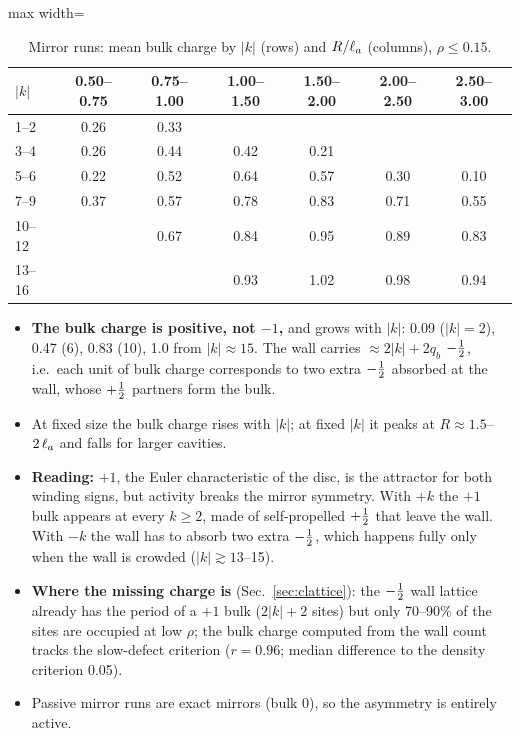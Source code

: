 \begin{table}[H]\centering\small
\caption{Mirror runs: mean bulk charge by $|k|$ (rows) and $R/\ell_a$ (columns), $\rho\le0.15$.}\label{tab:mirror2}
\begin{adjustbox}{max width=\textwidth}
\begin{tabular}{lcccccc}\toprule
$|k|$ & 0.50--0.75 & 0.75--1.00 & 1.00--1.50 & 1.50--2.00 & 2.00--2.50 & 2.50--3.00\\\midrule
1--2 & 0.26 & 0.33 & & & & \\
3--4 & 0.26 & 0.44 & 0.42 & 0.21 & & \\
5--6 & 0.22 & 0.52 & 0.64 & 0.57 & 0.30 & 0.10\\
7--9 & 0.37 & 0.57 & 0.78 & 0.83 & 0.71 & 0.55\\
10--12 & & 0.67 & 0.84 & 0.95 & 0.89 & 0.83\\
13--16 & & & 0.93 & 1.02 & 0.98 & 0.94\\\bottomrule
\end{tabular}
\end{adjustbox}
\end{table}
\begin{itemize}
  \item \textbf{The bulk charge is positive, not $-1$,} and grows with $|k|$: 0.09 ($|k|=2$), 0.47 (6), 0.83 (10), 1.0 from
        $|k|\approx15$. The wall carries $\approx2|k|+2q_b$ $-\tfrac12$, i.e.\ each unit of bulk charge corresponds to two extra $-\tfrac12$
        absorbed at the wall, whose $+\tfrac12$ partners form the bulk.
  \item At fixed size the bulk charge rises with $|k|$; at fixed $|k|$ it peaks at $R\approx1.5$--$2\,\ell_a$ and falls for larger
        cavities.
  \item \textbf{Reading:} $+1$, the Euler characteristic of the disc, is the attractor for both winding signs, but activity breaks
        the mirror symmetry. With $+k$ the $+1$ bulk appears at every $k\ge2$, made of self-propelled $+\tfrac12$ that leave the
        wall. With $-k$ the wall has to absorb two extra $-\tfrac12$, which happens fully only when the wall is crowded
        ($|k|\gtrsim13$--15).
  \item \textbf{Where the missing charge is} (Sec.~\ref{sec:clattice}): the $-\tfrac12$ wall lattice already has the period of a
        $+1$ bulk ($2|k|+2$ sites) but only 70--90\% of the sites are occupied at low $\rho$; the bulk charge computed from the
        wall count tracks the slow-defect criterion ($r=0.96$; median difference to the density criterion 0.05).
  \item Passive mirror runs are exact mirrors (bulk 0), so the asymmetry is entirely active.
\end{itemize}

